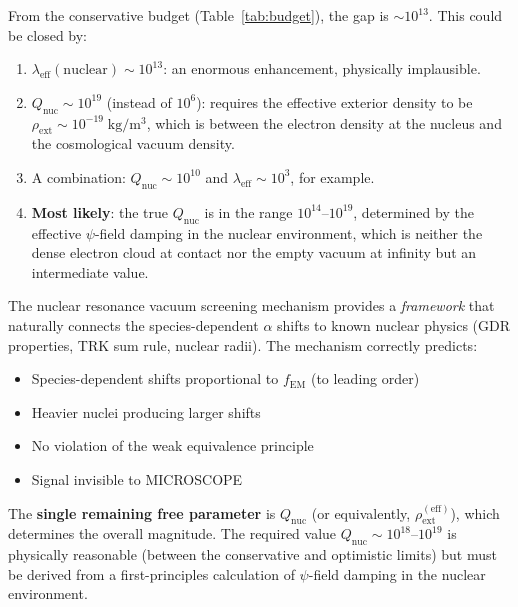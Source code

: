 \documentclass[aps,prd,twocolumn,superscriptaddress,nofootinbib]{revtex4-2}
\newcommand{\lam}{\lambda}
\newcommand{\fEM}{f_{\mathrm{EM}}}
\newcommand{\Qnuc}{Q_{\mathrm{nuc}}}
\begin{document}
From the conservative budget (Table~\ref{tab:budget}), the gap is
$\sim\!10^{13}$.  This could be closed by:

\begin{enumerate}[label=(\alph*)]
\item $\lam_{\mathrm{eff}}(\mathrm{nuclear}) \sim 10^{13}$: an
enormous enhancement, physically implausible.

\item $\Qnuc \sim 10^{19}$ (instead of $10^6$): requires the
effective exterior density to be $\rho_{\mathrm{ext}} \sim
10^{-19}\;\mathrm{kg/m^3}$, which is between the electron density
at the nucleus and the cosmological vacuum density.

\item A combination: $\Qnuc \sim 10^{10}$ and
$\lam_{\mathrm{eff}} \sim 10^{3}$, for example.

\item \textbf{Most likely}: the true $\Qnuc$ is in the range
$10^{14}$--$10^{19}$, determined by the effective $\psi$-field
damping in the nuclear environment, which is neither the dense
electron cloud at contact nor the empty vacuum at infinity but
an intermediate value.
\end{enumerate}

\begin{tcolorbox}[colback=green!5!white, colframe=green!50!black,
title=Critical Open Problem]
The nuclear resonance vacuum screening mechanism provides a
\emph{framework} that naturally connects the species-dependent
$\alpha$ shifts to known nuclear physics (GDR properties,
TRK sum rule, nuclear radii).  The mechanism correctly predicts:
\begin{itemize}[nosep]
\item Species-dependent shifts proportional to $\fEM$ (to leading order)
\item Heavier nuclei producing larger shifts
\item No violation of the weak equivalence principle
\item Signal invisible to MICROSCOPE
\end{itemize}

The \textbf{single remaining free parameter} is $\Qnuc$ (or
equivalently, $\rho_{\mathrm{ext}}^{(\mathrm{eff})}$), which
determines the overall magnitude.  The required value
$\Qnuc \sim 10^{18}$--$10^{19}$ is physically reasonable (between
the conservative and optimistic limits) but must be derived from
a first-principles calculation of $\psi$-field damping in the
nuclear environment.
\end{tcolorbox}
\end{document}
